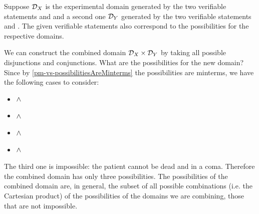 Suppose $\mathcal{D}_X$ is the experimental domain generated by the two verifiable statements  and  and a second one $\mathcal{D}_Y$ generated by the two verifiable statements  and . The given verifiable statements also correspond to the possibilities for the respective domains.

We can construct the combined domain $\mathcal{D}_X \times \mathcal{D}_Y$ by taking all possible disjunctions and conjunctions. What are the possibilities for the new domain? Since by \ref{pm-vs-possibilitiesAreMinterms} the possibilities are minterms, we have the following cases to consider:
\begin{itemize}
	\item {} $\wedge$ 
	\item {} $\wedge$ 
	\item {} $\wedge$ 
	\item {} $\wedge$ 
\end{itemize}
The third one is impossible: the patient cannot be dead and in a coma. Therefore the combined domain has only three possibilities. The possibilities of the combined domain are, in general, the subset of all possible combinations (i.e. the Cartesian product) of the possibilities of the domains we are combining, those that are not impossible.


